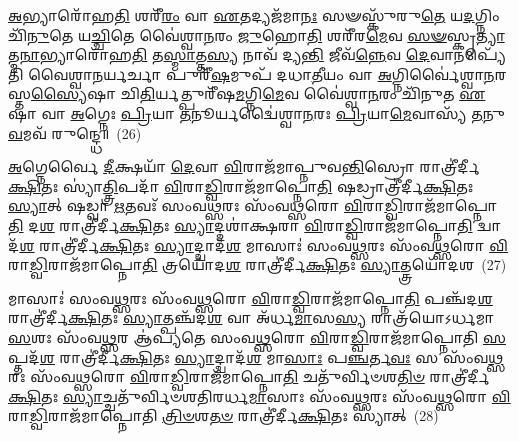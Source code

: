 \-\ul{𑌅}\-𑌭𑍍𑌯𑌾𑌰𑍋᳴𑌹\-\ul{𑌤𑌿} 𑌶𑌰𑍀᳴\-\ul{𑌰𑌂} 𑌵𑌾 \ul{𑌏}\-𑌤𑌦𑍍𑌯𑌜᳴𑌮𑌾\-\ul{𑌨𑌃} 𑌸𑍟𑌸𑍍𑌕𑍁᳴𑌰𑍁\-\ul{𑌤𑍇} 𑌯\-\ul{𑌦}\-𑌗𑍍𑌨𑌿𑌂 𑌚𑌿᳴\-\ul{𑌨𑍁}\-𑌤𑍇 𑌯\-\ul{𑌚𑍍𑌚𑌿}\-𑌤𑍇 𑌵𑍈॑𑌶𑍍𑌵𑌾\-\ul{𑌨}\-𑌰𑌂 \ul{𑌜𑍁}\-𑌹𑍋\-\ul{𑌤𑌿} 𑌶𑌰𑍀᳴𑌰\-\ul{𑌮𑍇}\-𑌵 \ul{𑌸}\-\-\ul{𑍟}\-𑌸𑍍𑌕𑍃\-\ul{𑌤𑍍𑌯𑌾}\-𑌤𑍍𑌮\-\ul{𑌨𑌾}\-𑌭𑍍𑌯𑌾𑌰𑍋᳴𑌹\-\ul{𑌤𑌿} 𑌤\-\ul{𑌸𑍍𑌮𑌾}\-𑌤𑍍𑌤\-\ul{𑌸𑍍𑌯} 𑌨𑌾𑌵᳴ 𑌦𑍍𑌯\-\ul{𑌨𑍍𑌤𑌿} 𑌜𑍀𑌵᳴\-\ul{𑌨𑍍𑌨𑍇}\-𑌵 \ul{𑌦𑍇}\-𑌵𑌾𑌨𑌪𑍍𑌯𑍇᳴𑌤𑌿 𑌵𑍈𑌶𑍍𑌵𑌾\-\ul{𑌨}\-𑌰𑍍𑌯𑌰𑍍𑌚𑌾 𑌪𑍁𑌰𑍀᳴\-\ul{𑌷}\-𑌮𑍁𑌪᳴ 𑌦𑌧𑌾\-\ul{𑌤𑍀}\-𑌯𑌂 𑌵𑌾 \ul{𑌅}\-𑌗𑍍𑌨𑌿𑌰𑍍𑌵𑍈॑𑌶𑍍𑌵𑌾\-\ul{𑌨}\-𑌰𑌸𑍍𑌤\-\ul{𑌸𑍍𑌯𑍈}\-𑌷𑌾 𑌚𑌿\-\ul{𑌤𑌿}\-𑌰𑍍𑌯𑌤𑍍𑌪𑍁𑌰𑍀᳴𑌷\-\ul{𑌮}\-𑌗𑍍𑌨𑌿\-\ul{𑌮𑍇}\-𑌵 𑌵𑍈॑𑌶𑍍𑌵𑌾\-\ul{𑌨}\-𑌰𑌂 𑌚𑌿᳴𑌨𑍁𑌤 \ul{𑌏}\-𑌷𑌾 𑌵𑌾 \ul{𑌅}\-𑌗𑍍𑌨𑍇𑌃 \ul{𑌪𑍍𑌰𑌿}\-𑌯𑌾 \ul{𑌤}\-𑌨𑍂𑌰𑍍𑌯𑌦𑍍𑌵𑍈॑𑌶𑍍𑌵𑌾\-\ul{𑌨}\-𑌰𑌃 \ul{𑌪𑍍𑌰𑌿}\-𑌯𑌾\-\ul{𑌮𑍇}\-𑌵𑌾𑌸𑍍𑌯᳴ \ul{𑌤}\-𑌨𑍁\-\ul{𑌵}\-𑌮𑌵᳴ 𑌰𑍁𑌨𑍍𑌦𑍍𑌧𑍇॥~(26)

{\anuvakamend[{\-\ul{𑌅}\-𑌗𑍍𑌨𑌿𑌸𑍍𑌤\-\ul{𑌥𑍍𑌸}\-\-\ul{𑍟}\-𑌸𑍍𑌕𑍃\-\ul{𑌤𑍍𑌯𑌾}\-𑌗𑍍𑌨𑍇𑌰𑍍𑌦𑌶᳴ 𑌚}]}%

\-\ul{𑌅}\-𑌗𑍍𑌨𑍇𑌰𑍍𑌵𑍈 \ul{𑌦𑍀}\-𑌕𑍍𑌷𑌯𑌾᳴ \ul{𑌦𑍇}\-𑌵𑌾 \ul{𑌵𑌿}\-𑌰𑌾𑌜᳴𑌮𑌾𑌪𑍍𑌨𑍁𑌵\-\ul{𑌨𑍍𑌤𑌿}\-𑌸𑍍𑌰𑍋 𑌰𑌾𑌤𑍍𑌰𑍀॑𑌰𑍍𑌦𑍀\-\ul{𑌕𑍍𑌷𑌿}\-𑌤𑌃 𑌸𑍍𑌯𑌾॑\-\ul{𑌤𑍍𑌤𑍍𑌰𑌿}\-𑌪𑌦𑌾᳴ \ul{𑌵𑌿}\-𑌰𑌾\-\ul{𑌡𑍍𑌵𑌿}\-𑌰𑌾𑌜᳴𑌮𑌾𑌪𑍍𑌨𑍋\-\ul{𑌤𑌿} 𑌷𑌡𑍍𑌰𑌾𑌤𑍍𑌰𑍀॑𑌰𑍍𑌦𑍀\-\ul{𑌕𑍍𑌷𑌿}\-𑌤𑌃 \ul{𑌸𑍍𑌯𑌾}\-𑌤𑍍 𑌷𑌡𑍍𑌵𑌾 \ul{𑌋}\-𑌤𑌵𑌃᳴ 𑌸𑌂𑌵\-\ul{𑌥𑍍𑌸}\-𑌰𑌃 𑌸𑌂᳴𑌵\-\ul{𑌥𑍍𑌸}\-𑌰𑍋 \ul{𑌵𑌿}\-𑌰𑌾\-\ul{𑌡𑍍𑌵𑌿}\-𑌰𑌾𑌜᳴𑌮𑌾𑌪𑍍𑌨𑍋\-\ul{𑌤𑌿} 𑌦\-\ul{𑌶} 𑌰𑌾𑌤𑍍𑌰𑍀॑𑌰𑍍𑌦𑍀\-\ul{𑌕𑍍𑌷𑌿}\-𑌤𑌃 \ul{𑌸𑍍𑌯𑌾}\-𑌦𑍍𑌦𑌶𑌾॑𑌕𑍍𑌷𑌰𑌾 \ul{𑌵𑌿}\-𑌰𑌾\-\ul{𑌡𑍍𑌵𑌿}\-𑌰𑌾𑌜᳴𑌮𑌾𑌪𑍍𑌨𑍋\-\ul{𑌤𑌿} 𑌦𑍍𑌵𑌾𑌦᳴\-\ul{𑌶} 𑌰𑌾𑌤𑍍𑌰𑍀॑𑌰𑍍𑌦𑍀\-\ul{𑌕𑍍𑌷𑌿}\-𑌤𑌃 \ul{𑌸𑍍𑌯𑌾}\-𑌦𑍍𑌦𑍍𑌵𑌾𑌦᳴\-\ul{𑌶} 𑌮𑌾𑌸𑌾𑌃॑ 𑌸𑌂𑌵\-\ul{𑌥𑍍𑌸}\-𑌰𑌃 𑌸𑌂᳴𑌵\-\ul{𑌥𑍍𑌸}\-𑌰𑍋 \ul{𑌵𑌿}\-𑌰𑌾\-\ul{𑌡𑍍𑌵𑌿}\-𑌰𑌾𑌜᳴𑌮𑌾𑌪𑍍𑌨𑍋\-\ul{𑌤𑌿} 𑌤𑍍𑌰𑌯𑍋᳴𑌦\-\ul{𑌶} 𑌰𑌾𑌤𑍍𑌰𑍀॑𑌰𑍍𑌦𑍀\-\ul{𑌕𑍍𑌷𑌿}\-𑌤𑌃 \ul{𑌸𑍍𑌯𑌾}\-𑌤𑍍𑌤𑍍𑌰𑌯𑍋᳴𑌦𑌶~(27)

𑌮𑌾𑌸𑌾𑌃॑ 𑌸𑌂𑌵\-\ul{𑌥𑍍𑌸}\-𑌰𑌃 𑌸𑌂᳴𑌵\-\ul{𑌥𑍍𑌸}\-𑌰𑍋 \ul{𑌵𑌿}\-𑌰𑌾\-\ul{𑌡𑍍𑌵𑌿}\-𑌰𑌾𑌜᳴𑌮𑌾𑌪𑍍𑌨𑍋\-\ul{𑌤𑌿} 𑌪𑌞𑍍𑌚᳴𑌦\-\ul{𑌶} 𑌰𑌾𑌤𑍍𑌰𑍀॑𑌰𑍍𑌦𑍀\-\ul{𑌕𑍍𑌷𑌿}\-𑌤𑌃 \ul{𑌸𑍍𑌯𑌾}\-𑌤𑍍𑌪𑌞𑍍𑌚᳴𑌦\-\ul{𑌶} 𑌵𑌾 𑌅᳴𑌰𑍍𑌧\-\ul{𑌮𑌾}\-𑌸\-\ul{𑌸𑍍𑌯} 𑌰𑌾𑌤𑍍𑌰᳴𑌯𑍋\-𑌽𑌰𑍍𑌧𑌮𑌾\-\ul{𑌸}\-𑌶𑌃 𑌸𑌂᳴𑌵\-\ul{𑌥𑍍𑌸}\-𑌰 𑌆॑𑌪𑍍𑌯𑌤𑍇 𑌸𑌂𑌵\-\ul{𑌥𑍍𑌸}\-𑌰𑍋 \ul{𑌵𑌿}\-𑌰𑌾\-\ul{𑌡𑍍𑌵𑌿}\-𑌰𑌾𑌜᳴𑌮𑌾𑌪𑍍𑌨𑍋𑌤𑌿 \ul{𑌸}\-𑌪𑍍𑌤𑌦᳴\-\ul{𑌶} 𑌰𑌾𑌤𑍍𑌰𑍀॑𑌰𑍍𑌦𑍀\-\ul{𑌕𑍍𑌷𑌿}\-𑌤𑌃 \ul{𑌸𑍍𑌯𑌾}\-𑌦𑍍𑌦𑍍𑌵𑌾𑌦᳴\-\ul{𑌶} 𑌮𑌾\-\ul{𑌸𑌾𑌃} 𑌪\-\ul{𑌞𑍍𑌚}\-𑌰𑍍𑌤\-\ul{𑌵𑌃} 𑌸 𑌸𑌂᳴𑌵\-\ul{𑌥𑍍𑌸}\-𑌰𑌃 𑌸𑌂᳴𑌵\-\ul{𑌥𑍍𑌸}\-𑌰𑍋 \ul{𑌵𑌿}\-𑌰𑌾\-\ul{𑌡𑍍𑌵𑌿}\-𑌰𑌾𑌜᳴𑌮𑌾𑌪𑍍𑌨𑍋\-\ul{𑌤𑌿} 𑌚𑌤𑍁᳴𑌰𑍍𑌵𑌿𑍞𑌶\-\ul{𑌤𑌿}\-\-\ul{𑍞} 𑌰𑌾𑌤𑍍𑌰𑍀॑𑌰𑍍𑌦𑍀\-\ul{𑌕𑍍𑌷𑌿}\-𑌤𑌃 \ul{𑌸𑍍𑌯𑌾}\-𑌚𑍍𑌚𑌤𑍁᳴𑌰𑍍𑌵𑌿𑍞𑌶𑌤𑌿𑌰𑌰𑍍𑌧\-\ul{𑌮𑌾}\-𑌸𑌾𑌃 𑌸𑌂᳴𑌵\-\ul{𑌥𑍍𑌸}\-𑌰𑌃 𑌸𑌂᳴𑌵\-\ul{𑌥𑍍𑌸}\-𑌰𑍋 \ul{𑌵𑌿}\-𑌰𑌾\-\ul{𑌡𑍍𑌵𑌿}\-𑌰𑌾𑌜᳴𑌮𑌾𑌪𑍍𑌨𑍋𑌤𑌿 \ul{𑌤𑍍𑌰𑌿}\-\-\ul{𑍞}\-𑌶\-\ul{𑌤}\-\-\ul{𑍞} 𑌰𑌾𑌤𑍍𑌰𑍀॑𑌰𑍍𑌦𑍀\-\ul{𑌕𑍍𑌷𑌿}\-𑌤𑌃 𑌸𑍍𑌯𑌾॑𑌤𑍍~(28)

